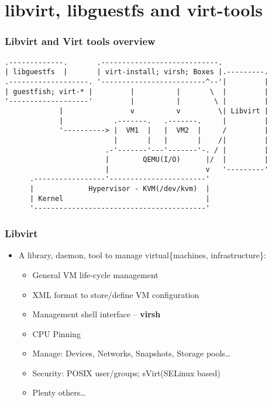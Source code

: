 \documentclass[pdfte x,unicode,minimal,xcolor=table]{beamer}
\begin{document}
\section{libvirt, libguestfs and virt-tools} 

\begin{frame}[fragile]
\frametitle{Libvirt and Virt tools overview}
    \begin{verbatim}
.-------------.       .----------------------------.
| libguestfs  |       | virt-install; virsh; Boxes |.---------.
.-------------------. '-------------------------^--'|         |
| guestfish; virt-* |         |          |       \  |         |
'-------------------'         |          |        \ |         |
             |                v          v         \| Libvirt |
             |            .-------.   .-------.     |         |
             '----------> |  VM1  |   |  VM2  |     /         |
                          |       |   |       |    /|         |
                        .-'-------'---'-------'-. / |         |
                        |        QEMU(I/O)      |/  |         |
                        |                       v   '---------'
      .-----------------'-----------------------'
      |             Hypervisor - KVM(/dev/kvm)  |
      | Kernel                                  |
      '-----------------------------------------'
    \end{verbatim}
\end{frame}

\begin{frame}
\frametitle{Libvirt}
\begin{itemize}
    \item A library, daemon, tool to manage virtual\{machines, infrastructure\}:
    \begin{itemize} %
    \item General VM life-cycle management 
    \item XML format to store/define VM configuration
    \item Management shell interface -- \textbf{\alert{virsh}}
    \item CPU Pinning
    \item Manage: Devices, Networks, Snapshots, Storage pools\ldots
    \item Security: POSIX user/groups; sVirt(SELinux based)
    \item \alert{Plenty others\ldots}
    \end{itemize}
\end{itemize}
\end{frame}
\end{document}
